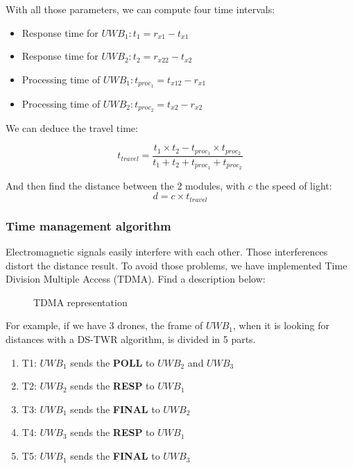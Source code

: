 \documentclass[conference]{IEEEtran}
\begin{document}
\noindent With all those parameters, we can compute four time intervals:
\begin{itemize}
    \item Response time for $UWB_1 : t_1 = r_{x1} - t_{x1}$
    \item Response time for $UWB_2 : t_2 = r_{x22} - t_{x2}$
    \item Processing time of $UWB_1 : t_{proc_1} = t_{x12} - r_{x1}$
    \item Processing time of $UWB_2 : t_{proc_2} = t_{x2} - r_{x2}$
\end{itemize}

\noindent We can deduce the travel time:

\begin{equation}
\boxed{t_{travel} = \frac{t_1 \times t_2 - t_{proc_1} \times t_{proc_2}}{ t_1 +t_2+t_{proc_1}+t_{proc_2}}}
\end{equation}

\noindent And then find the distance between the 2 modules, with $c$ the speed of light:
\begin{equation}
    d = c \times t_{travel}
\end{equation}

\subsubsection{Time management algorithm}
Electromagnetic signals easily interfere with each other. Those interferences
distort the distance result. To avoid those problems, we have implemented
Time Division Multiple Access (TDMA). Find a description below:

\begin{figure}[H]
    \centering
    \resizebox{0.8\linewidth}{!}{\TDMA}
    \caption{TDMA representation}
    \label{fig:TDMA}
\end{figure}

For example, if we have 3 drones, the frame of $UWB_1$, when it is looking for
distances with a DS-TWR algorithm, is divided in 5 parts.
\begin{enumerate}
    \item T1: $UWB_1$ sends the \textbf{POLL} to $UWB_2$ and $UWB_3$
    \item T2: $UWB_2$ sends the \textbf{RESP} to $UWB_1$
    \item T3: $UWB_1$ sends the \textbf{FINAL} to $UWB_2$
    \item T4: $UWB_3$ sends the \textbf{RESP} to $UWB_1$
    \item T5: $UWB_1$ sends the \textbf{FINAL} to $UWB_3$
\end{enumerate}
\end{document}
